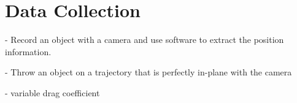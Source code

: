 \section{Data Collection}

- Record an object with a camera and use software to extract the position information.

- Throw an object on a trajectory that is perfectly in-plane with the camera

- variable drag coefficient 
